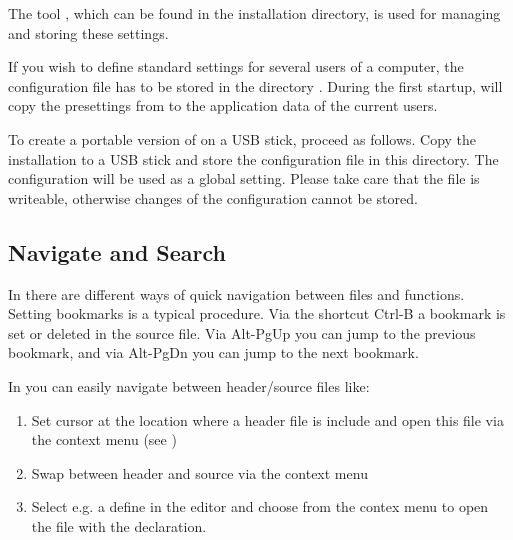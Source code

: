 The tool , which can be found in the \codeblocks installation directory, is used for managing and storing these settings.

If you wish to define standard settings for several users of a computer, the configuration file  has to be stored in the directory . During the first startup, \codeblocks will copy the presettings from  to the application data of the current users.

To create a portable version of \codeblocks on a USB stick, proceed as follows. Copy the \codeblocks installation to a USB stick and store the configuration file  in this directory. The configuration will be used as a global setting. Please take care that the file is writeable, otherwise changes of the configuration cannot be stored.

\subsection{Navigate and Search}

In \codeblocks there are different ways of quick navigation between files and functions. Setting bookmarks is a typical procedure. Via the shortcut Ctrl-B a bookmark is set or deleted in the source file. Via Alt-PgUp you can jump to the previous bookmark, and via Alt-PgDn you can jump to the next bookmark.



In \codeblocks you can easily navigate between header/source files like:

\begin{enumerate}
\item Set cursor at the location where a header file is include and open this file via the context menu  (see )
\item Swap between header and source via the context menu 
\item Select e.g. a define in the editor and choose  from the contex menu to open the file with the declaration.
\end{enumerate}

